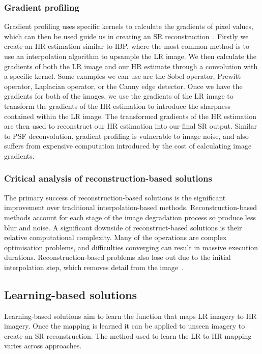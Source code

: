 \subsubsection{Gradient profiling}
Gradient profiling uses specific kernels to calculate the gradients of pixel values, which can then be used guide us in creating an SR reconstruction~\cite{ref}. Firstly we create an HR estimation similar to IBP, where the most common method is to use an interpolation algorithm to upsample the LR image. We then calculate the gradients of both the LR image and our HR estimate through a convolution with a specific kernel. Some examples we can use are the Sobel operator, Prewitt operator, Laplacian operator, or the Canny edge detector. Once we have the gradients for both of the images, we use the gradients of the LR image to transform the gradients of the HR estimation to introduce the sharpness contained within the LR image. The transformed gradients of the HR estimation are then used to reconstruct our HR estimation into our final SR output. Similar to PSF deconvolution, gradient profiling is vulnerable to image noise, and also suffers from expensive computation introduced by the cost of calculating image gradients.

\subsubsection{Critical analysis of reconstruction-based solutions}
The primary success of reconstruction-based solutions is the significant improvement over traditional interpolation-based methods. Reconstruction-based methods account for each stage of the image degradation process so produce less blur and noise. A significant downside of reconstruct-based solutions is their relative computational complexity. Many of the operations are complex optimisation problems, and difficulties converging can result in massive execution durations. Reconstruction-based problems also lose out due to the initial interpolation step, which removes detail from the image~\cite{remoteSensingGANsReview}.

\subsection{Learning-based solutions}
Learning-based solutions aim to learn the function that maps LR imagery to HR imagery. Once the mapping is learned it can be applied to unseen imagery to create an SR reconstruction. The method used to learn the LR to HR mapping varies across approaches.

